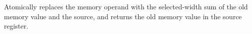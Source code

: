 Atomically replaces the memory operand with the selected-width sum of the old memory value and the source, and returns the old memory value in the source register.
